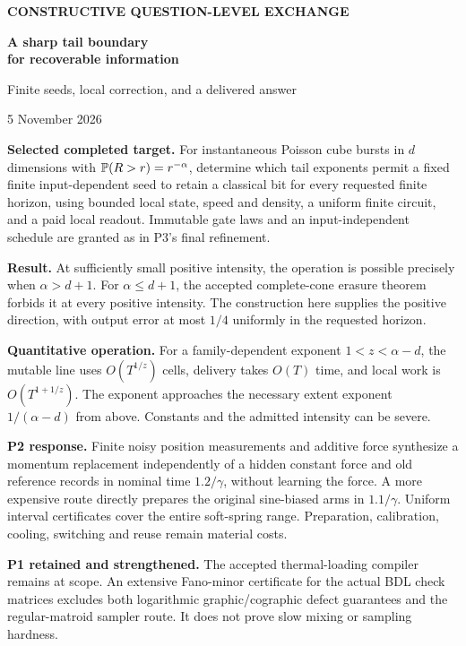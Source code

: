 \documentclass[11pt,a4paper]{article}
\begin{document}
\thispagestyle{empty}
{\small\bfseries\color{accent}CONSTRUCTIVE QUESTION-LEVEL EXCHANGE}\par
\vspace{5mm}
{\Huge\bfseries\color{ink}A sharp tail boundary\\for recoverable information}\par
\vspace{5mm}
{\Large Finite seeds, local correction, and a delivered answer}\par
\vspace{4mm}
{\large 5 November 2026}\par
\vspace{5mm}
\textbf{Selected completed target.}
For instantaneous Poisson cube bursts in $d$ dimensions with
$\mathbb P(R>r)=r^{-\alpha}$, determine which tail exponents permit a fixed finite input-dependent seed to retain a classical bit for every requested finite horizon, using bounded local state, speed and density, a uniform finite circuit, and a paid local readout. Immutable gate laws and an input-independent schedule are granted as in P3's final refinement.

\textbf{Result.}
At sufficiently small positive intensity, the operation is possible precisely when $\alpha>d+1$. For $\alpha\le d+1$, the accepted complete-cone erasure theorem forbids it at every positive intensity. The construction here supplies the positive direction, with output error at most $1/4$ uniformly in the requested horizon.

\textbf{Quantitative operation.}
For a family-dependent exponent $1<z<\alpha-d$, the mutable line uses $O(T^{1/z})$ cells, delivery takes $O(T)$ time, and local work is $O(T^{1+1/z})$. The exponent approaches the necessary extent exponent $1/(\alpha-d)$ from above. Constants and the admitted intensity can be severe.

\textbf{P2 response.}
Finite noisy position measurements and additive force synthesize a momentum replacement independently of a hidden constant force and old reference records in nominal time $1.2/\gamma$, without learning the force. A more expensive route directly prepares the original sine-biased arms in $1.1/\gamma$. Uniform interval certificates cover the entire soft-spring range. Preparation, calibration, cooling, switching and reuse remain material costs.

\textbf{P1 retained and strengthened.}
The accepted thermal-loading compiler remains at scope. An extensive Fano-minor certificate for the actual BDL check matrices excludes both logarithmic graphic/cographic defect guarantees and the regular-matroid sampler route. It does not prove slow mixing or sampling hardness.
\end{document}
